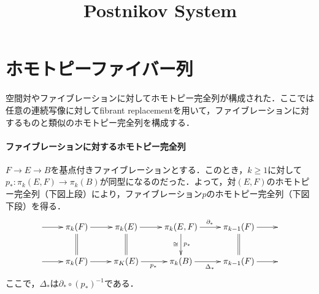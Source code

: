 \documentclass[a4paper,11pt]{jsarticle}
\theoremstyle{definition}
\begin{document}
\date{}
\title{Postnikov System}

\maketitle


\tableofcontents

\section{ホモトピーファイバー列}
空間対やファイブレーションに対してホモトピー完全列が構成された．ここでは任意の連続写像に対してfibrant replacementを用いて，ファイブレーションに対するものと類似のホモトピー完全列を構成する．
\paragraph{ファイブレーションに対するホモトピー完全列}
$F\rightarrow E\rightarrow B$を基点付きファイブレーションとする．このとき，$k\ge 1$に対して$p_*\colon \pi_k(E,F)\to \pi_k(B)$が同型になるのだった．よって，対$(E,F)$のホモトピー完全列（下図上段）により，ファイブレーション$p$のホモトピー完全列（下図下段）を得る．
\[\xymatrix{
  \ar[r]&
  \pi_k(F)\ar@{=}[d]\ar[r] &
  \pi_k(E)\ar@{=}[d]\ar[r] &
  \pi_k(E,F)\ar[d]_{\cong}^{p_*}\ar[r]^{\partial_*} &
  \pi_{k-1}(F)\ar@{=}[d]\ar[r]&
  \\
  \ar[r]&
  \pi_k(F)\ar[r] &
  \pi_K(E)\ar[r]_{p_*} &
  \pi_k(B)\ar[r]_{\Delta_*} &
  \pi_{k-1}(F)\ar[r]&
}\]
ここで，$\Delta_*$は$\partial_*\circ (p_*)^{-1}$である．
\end{document}

